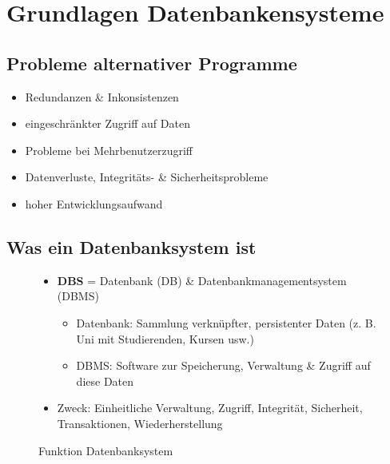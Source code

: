 \documentclass[12pt,a4paper]{article}
\begin{document}
\tableofcontents
\newpage

\section{Grundlagen Datenbankensysteme}

\subsection{Probleme alternativer Programme}

\begin{itemize}
\item Redundanzen \& Inkonsistenzen
\item eingeschränkter Zugriff auf Daten
\item Probleme bei Mehrbenutzerzugriff
\item Datenverluste, Integritäts- \& Sicherheitsprobleme
\item hoher Entwicklungsaufwand
\end{itemize}

\subsection{Was ein Datenbanksystem ist}

\begin{figure}[H]
\begin{minipage}[t]{0.45\textwidth}
\begin{itemize}
\item \textbf{DBS} = Datenbank (DB) \& Datenbankmanagementsystem (DBMS)
\begin{itemize}
\item Datenbank: Sammlung verknüpfter, persistenter Daten (z. B. Uni mit Studierenden, Kursen usw.)
\item DBMS: Software zur Speicherung, Verwaltung \& Zugriff auf diese Daten
\end{itemize}
\item Zweck: Einheitliche Verwaltung, Zugriff, Integrität, Sicherheit, Transaktionen, Wiederherstellung
\end{itemize}
\end{minipage}
\hfill
\begin{minipage}[t]{0.45\textwidth}
\centering
\vspace{5mm}
\caption{Funktion Datenbanksystem}
\end{minipage}
\end{figure}
\end{document}
